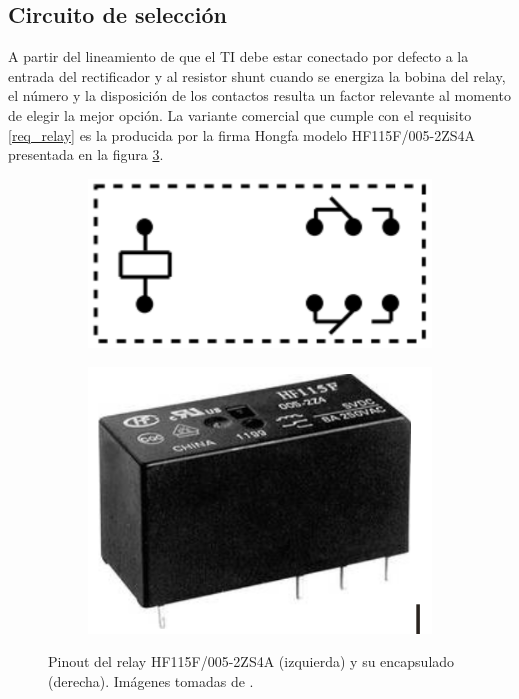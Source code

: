 \subsection{Circuito de selección}
A partir del lineamiento de que el TI debe estar conectado por defecto a la entrada del rectificador y al resistor shunt cuando se energiza la bobina del relay, el número y la disposición de los contactos resulta un factor relevante al momento de elegir la mejor opción. La variante comercial que cumple con el requisito \ref{req_relay} es la producida por la firma Hongfa modelo HF115F/005-2ZS4A presentada en la figura \ref{fig:relay}.
\begin{figure}[h!]
    \centering
	\begin{subfigure}[b]{0.4\textwidth}
		\centering
		\includegraphics[width=.7\textwidth]{./Figures/relay_pinout}
		\caption{}
		\label{fig:relay_pinout}
	\end{subfigure}
    \centering
	\begin{subfigure}[b]{0.4\textwidth}
		\centering
		\includegraphics[width=.7\textwidth]{./Figures/relay_encapsulado}
		\caption{}
		\label{fig:relay_encapsulado}
	\end{subfigure}
	\caption{Pinout del relay HF115F/005-2ZS4A (izquierda) y su encapsulado (derecha). Imágenes tomadas de \citep{datasheet_relay}.}
	\label{fig:relay}
\end{figure}

